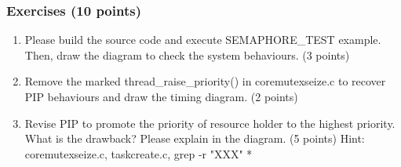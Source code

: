 \documentclass[t]{beamer}
\begin{document}
\begin{frame}
\frametitle{Exercises (10 points)}
\begin{enumerate}
\item Please build the source code and execute SEMAPHORE\_TEST example. Then, draw the diagram to check the system behaviours. (3 points)
\item Remove the marked thread\_raise\_priority() in coremutexseize.c to recover PIP behaviours and draw the timing diagram. (2 points)
\item Revise PIP to promote the priority of resource holder to the highest priority. What is the drawback? Please explain in the diagram. (5 points)
\newline Hint: coremutexseize.c, taskcreate.c, grep -r "XXX" *
\end{enumerate}
\end{frame}
\end{document}
